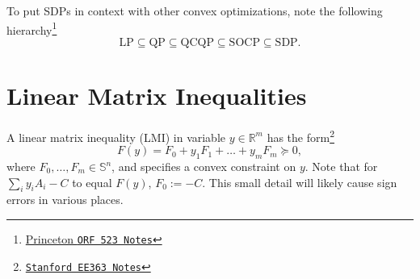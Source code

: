 \documentclass[a4paper]{article}
\begin{document}
To put SDPs in context with other convex optimizations, note the following hierarchy\footnote{\href{http://www.princeton.edu/~amirali/Public/Teaching/ORF523/S16/ORF523_S16_Lec9_gh.pdf}{Princeton \texttt{ORF 523 Notes}}}
\begin{equation*}
\text{LP}\subseteq\text{QP}\subseteq\text{QCQP}\subseteq\text{SOCP}\subseteq\text{SDP}.
\end{equation*}


\section*{Linear Matrix Inequalities}
A linear matrix inequality (LMI) in variable $y\in\mathbb{R}^m$ has the form\footnote{\href{https://stanford.edu/class/ee363/sessions/s4notes.pdf}{\texttt{Stanford EE363 Notes}}}
\begin{equation}
F(y) = F_0 + y_1F_1 + \dots + y_mF_m \succeq 0,
\end{equation}
where $F_0,\dots,F_m\in\mathbb{S}^n$, and specifies a convex constraint on $y$.
Note that for $\sum_i y_iA_i-C$ to equal $F(y)$, $F_0:=-C$.
This small detail will likely cause sign errors in various places.
\end{document}
